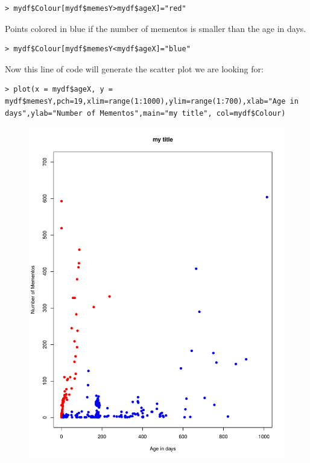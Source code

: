 \documentclass[a4paper, 11pt]{article}
\begin{document}
\begin{lstlisting}
> mydf$Colour[mydf$memesY>mydf$ageX]="red"
\end{lstlisting}

Points colored in blue if the number of mementos is smaller than the age in days.

\begin{lstlisting}
> mydf$Colour[mydf$memesY<mydf$ageX]="blue"
\end{lstlisting}

Now this line of code will generate the scatter plot we are looking for:

\begin{lstlisting}
> plot(x = mydf$ageX, y = mydf$memesY,pch=19,xlim=range(1:1000),ylim=range(1:700),xlab="Age in days",ylab="Number of Mementos",main="my title", col=mydf$Colour)
\end{lstlisting}


\begin{figure}[H]
\centering
\includegraphics[scale=0.7]{splot2.pdf}
\end{figure}
\pagebreak
\end{document}
